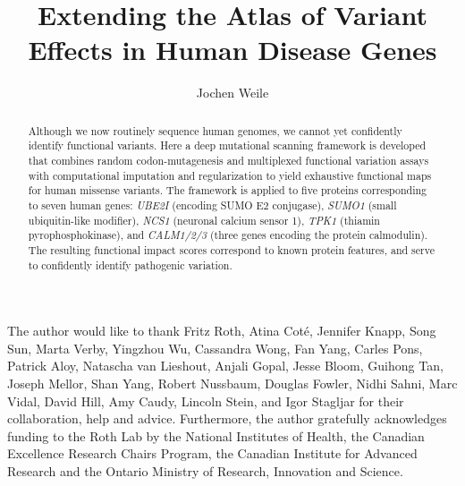 \documentclass[12pt]{ut-thesis}
\author{Jochen Weile}
\title{Extending the Atlas of Variant Effects in Human Disease Genes}
\newcommand{\gene}[1]{\textit{#1}}
\begin{document}
\begin{preliminary}

\maketitle


\begin{abstract}

Although we now routinely sequence human genomes, we cannot yet confidently identify functional variants. Here a deep mutational scanning framework is developed that combines random codon-mutagenesis and multiplexed functional variation assays with computational imputation and regularization to yield exhaustive functional maps for human missense variants. The framework is applied to five proteins corresponding to seven human genes: \gene{UBE2I} (encoding SUMO E2 conjugase), \gene{SUMO1} (small ubiquitin-like modifier), \gene{NCS1} (neuronal calcium sensor 1), \gene{TPK1} (thiamin pyrophosphokinase), and \gene{CALM1/2/3} (three genes encoding the protein calmodulin). The resulting functional impact scores correspond to known protein features, and serve to confidently identify pathogenic variation. %
\end{abstract}



\begin{acknowledgements}
The author would like to thank Fritz Roth, Atina Cot\'e, Jennifer Knapp, Song Sun, Marta Verby, Yingzhou Wu, Cassandra Wong, Fan Yang, Carles Pons, Patrick Aloy, Natascha van Lieshout, Anjali Gopal, Jesse Bloom, Guihong Tan, Joseph Mellor, Shan Yang, Robert Nussbaum, Douglas Fowler, Nidhi Sahni, Marc Vidal, David Hill, Amy Caudy, Lincoln Stein, and Igor Stagljar for their collaboration, help and advice. Furthermore, the author gratefully acknowledges funding to the Roth Lab by the National Institutes of Health, the Canadian Excellence Research Chairs Program, the Canadian Institute for Advanced Research and the Ontario Ministry of Research, Innovation and Science. 
\end{acknowledgements}

\tableofcontents




\end{preliminary}
\end{document}
